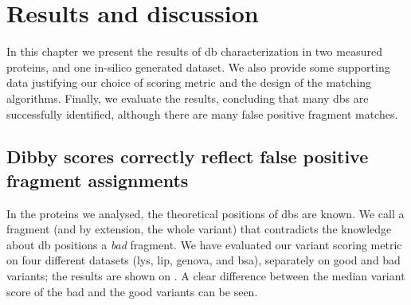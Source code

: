 \chapter{Results and discussion}

In this chapter we present the results of \gls*{db} characterization in two measured proteins, and one in-silico generated dataset. We also provide some supporting data justifying our choice of scoring metric and the design of the matching algorithms. Finally, we evaluate the results, concluding that many \glspl*{db} are successfully identified, although there are many false positive fragment matches.

\section{Dibby scores correctly reflect false positive fragment assignments}

In the proteins we analysed, the theoretical positions of \glspl*{db} are known. We call a fragment (and by extension, the whole variant) that contradicts the knowledge about \gls*{db} positions a \emph{bad} fragment. We have evaluated our variant scoring metric on four different datasets (\gls*{lys}, \gls*{lip}, \gls*{genova}, and \gls*{bsa}), separately on good and bad variants; the results are shown on . A clear difference between the median variant score of the bad and the good variants can be seen.

